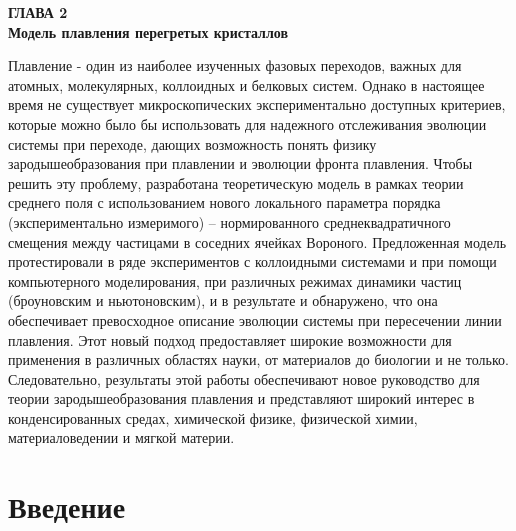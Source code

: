 
\newpage
\begin{center}
\textbf{\large ГЛАВА 2 \\ Модель плавления перегретых кристаллов}
\end{center}


Плавление - один из наиболее изученных фазовых переходов, важных для атомных, молекулярных, коллоидных и белковых систем.
Однако в настоящее время не существует микроскопических экспериментально доступных критериев, которые можно было бы использовать для надежного отслеживания эволюции системы при переходе, дающих возможность  понять физику зародышеобразования при плавлении и эволюции фронта плавления.
Чтобы решить эту проблему, разработана теоретическую модель в рамках теории среднего поля с использованием нового локального параметра порядка (экспериментально измеримого) -- нормированного среднеквадратичного смещения между частицами в соседних ячейках Вороного.
Предложенная модель протестировали в ряде экспериментов с коллоидными системами и при помощи компьютерного моделирования, при различных режимах динамики частиц (броуновским и ньютоновским), и в результате и обнаружено, что она обеспечивает превосходное описание эволюции системы при пересечении линии плавления.
Этот новый подход предоставляет широкие возможности для применения в различных областях науки, от материалов до биологии и не только.
Следовательно, результаты этой работы обеспечивают новое руководство для теории зародышеобразования плавления и представляют широкий интерес в конденсированных средах, химической физике, физической химии, материаловедении и мягкой материи.

\section{Введение}

